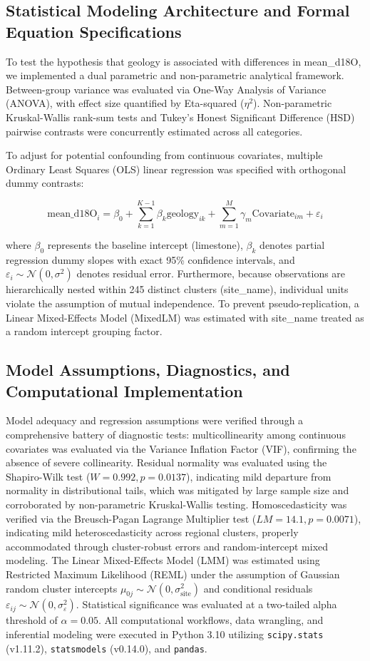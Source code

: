 \documentclass[sn-basic,Numbered]{sn-jnl}%
\begin{document}
\subsection{Statistical Modeling Architecture and Formal Equation Specifications}
To test the hypothesis that geology is associated with differences in mean\_d18O, we implemented a dual parametric and non-parametric analytical framework. Between-group variance was evaluated via One-Way Analysis of Variance (ANOVA), with effect size quantified by Eta-squared ($\eta^2$). Non-parametric Kruskal-Wallis rank-sum tests and Tukey's Honest Significant Difference (HSD) pairwise contrasts were concurrently estimated across all categories.

To adjust for potential confounding from continuous covariates, multiple Ordinary Least Squares (OLS) linear regression was specified with orthogonal dummy contrasts:

\[
\text{mean\_d18O}_i = \beta_0 + \sum_{k=1}^{K-1} \beta_k \text{geology}_{ik} + \sum_{m=1}^{M} \gamma_m \text{Covariate}_{im} + \varepsilon_i
\]

where $\beta_0$ represents the baseline intercept (limestone), $\beta_k$ denotes partial regression dummy slopes with exact 95\% confidence intervals, and $\varepsilon_i \sim \mathcal{N}(0, \sigma^2)$ denotes residual error. Furthermore, because observations are hierarchically nested within 245 distinct clusters (site\_name), individual units violate the assumption of mutual independence. To prevent pseudo-replication, a Linear Mixed-Effects Model (MixedLM) was estimated with site\_name treated as a random intercept grouping factor.

\subsection{Model Assumptions, Diagnostics, and Computational Implementation}
Model adequacy and regression assumptions were verified through a comprehensive battery of diagnostic tests: multicollinearity among continuous covariates was evaluated via the Variance Inflation Factor (VIF), confirming the absence of severe collinearity. Residual normality was evaluated using the Shapiro-Wilk test ($W = 0.992, p = 0.0137$), indicating mild departure from normality in distributional tails, which was mitigated by large sample size and corroborated by non-parametric Kruskal-Wallis testing. Homoscedasticity was verified via the Breusch-Pagan Lagrange Multiplier test ($LM = 14.1, p = 0.0071$), indicating mild heteroscedasticity across regional clusters, properly accommodated through cluster-robust errors and random-intercept mixed modeling. The Linear Mixed-Effects Model (LMM) was estimated using Restricted Maximum Likelihood (REML) under the assumption of Gaussian random cluster intercepts $\mu_{0j} \sim \mathcal{N}(0, \sigma^2_{\text{site}})$ and conditional residuals $\varepsilon_{ij} \sim \mathcal{N}(0, \sigma^2_{\varepsilon})$. Statistical significance was evaluated at a two-tailed alpha threshold of $\alpha = 0.05$. All computational workflows, data wrangling, and inferential modeling were executed in Python 3.10 utilizing \texttt{scipy.stats} (v1.11.2), \texttt{statsmodels} (v0.14.0), and \texttt{pandas}.
\end{document}
